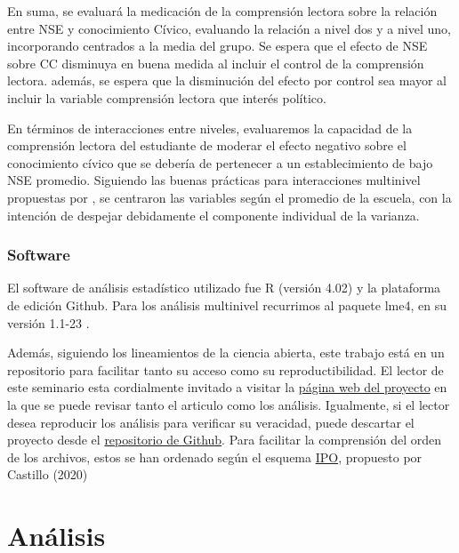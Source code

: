 \documentclass[12pt,twoside]{templates/facsothesis}
\begin{document}
En suma, se evaluará la medicación de la comprensión lectora sobre la relación entre NSE y conocimiento Cívico, evaluando la relación a nivel dos y a nivel uno, incorporando centrados a la media del grupo. Se espera que el efecto de NSE sobre CC disminuya en buena medida al incluir el control de la comprensión lectora. además, se espera que la disminución del efecto por control sea mayor al incluir la variable comprensión lectora que interés político.

En términos de interacciones entre niveles, evaluaremos la capacidad de la comprensión lectora del estudiante de moderar el efecto negativo sobre el conocimiento cívico que se debería de pertenecer a un establecimiento de bajo NSE promedio. Siguiendo las buenas prácticas para interacciones multinivel propuestas por \citep{aguinis_BestPractice_2013}, se centraron las variables según el promedio de la escuela, con la intención de despejar debidamente el componente individual de la varianza.

\hypertarget{software}{%
\subsection{Software}\label{software}}

El software de análisis estadístico utilizado fue R (versión 4.02) y la plataforma de edición Github. Para los análisis multinivel recurrimos al paquete lme4, en su versión 1.1-23 \citep{bates_Package_2020}.

Además, siguiendo los lineamientos de la ciencia abierta, este trabajo está en un repositorio para facilitar tanto su acceso como su reproductibilidad. El lector de este seminario esta cordialmente invitado a visitar la \href{https://franciscomeneses.github.io/Seminario/docs/index.html}{página web del proyecto} en la que se puede revisar tanto el articulo como los análisis. Igualmente, si el lector desea reproducir los análisis para verificar su veracidad, puede descartar el proyecto desde el \href{https://github.com/franciscomeneses/Seminario}{repositorio de Github}. Para facilitar la comprensión del orden de los archivos, estos se han ordenado según el esquema \href{https://juancarloscastillo.github.io/ipo/}{IPO}, propuesto por Castillo (2020)

\hypertarget{anuxe1lisis}{%
\chapter{Análisis}\label{anuxe1lisis}}
\end{document}
